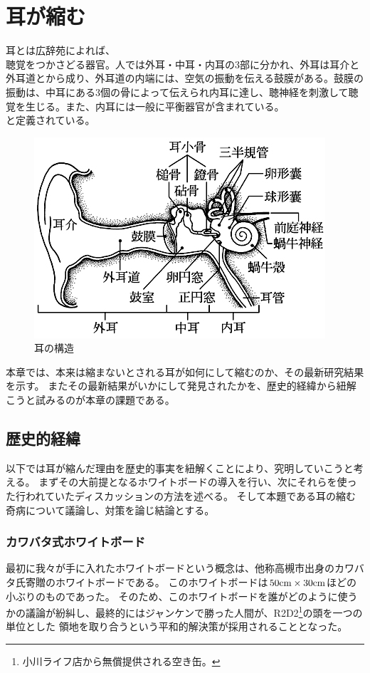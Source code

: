 \chapter{耳が縮む}
耳とは広辞苑によれば、
\\
  聴覚をつかさどる器官。人では外耳・中耳・内耳の3部に分かれ、外耳は耳介と外耳道とから成り、外耳道の内端には、空気の振動を伝える鼓膜がある。鼓膜の振動は、中耳にある3個の骨によって伝えられ内耳に達し、聴神経を刺激して聴覚を生じる。また、内耳には一般に平衡器官が含まれている。
\\
と定義されている。

\begin{figure}
  \centering
  \includegraphics[scale=0.5]{./section/Mimi/figures/Koujien.jpg}
  \caption{耳の構造}
  \label{mimi}
\end{figure}

\par

本章では、本来は縮まないとされる耳が如何にして縮むのか、その最新研究結果を示す。
またその最新結果がいかにして発見されたかを、歴史的経緯から紐解こうと試みるのが本章の課題である。

\section{歴史的経緯}
以下では耳が縮んだ理由を歴史的事実を紐解くことにより、究明していこうと考える。
まずその大前提となるホワイトボードの導入を行い、次にそれらを使った行われていたディスカッションの方法を述べる。
そして本題である耳の縮む奇病について議論し、対策を論じ結論とする。

\subsection{カワバタ式ホワイトボード}
最初に我々が手に入れたホワイトボードという概念は、他称高槻市出身のカワバタ氏寄贈のホワイトボードである。
このホワイトボードは$50\rm{cm}\times30\rm{cm}$ほどの小ぶりのものであった。
そのため、このホワイトボードを誰がどのように使うかの議論が紛糾し、最終的にはジャンケンで勝った人間が、R2D2\footnote{小川ライフ店から無償提供される空き缶。}の頭を一つの単位とした
領地を取り合うという平和的解決策が採用されることとなった。

